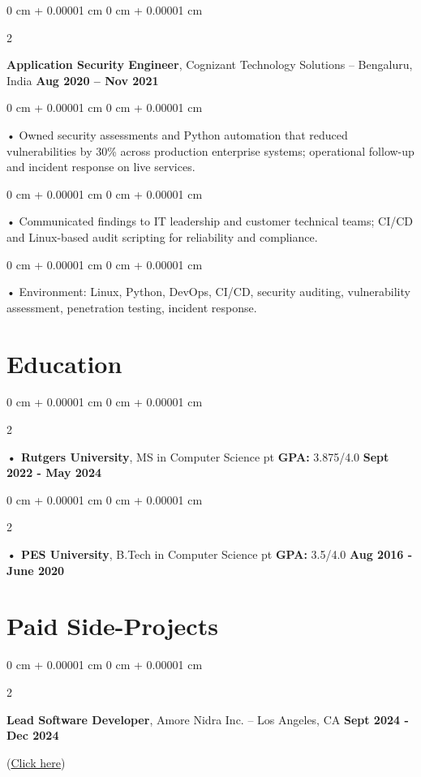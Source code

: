 \documentclass[10pt, letterpaper]{article}
\newenvironment{onecolentry}{
    \begin{adjustwidth}{
        0 cm + 0.00001 cm
    }{
        0 cm + 0.00001 cm
    }
}{
    \end{adjustwidth}
} %
\newenvironment{twocolentry}[2][]{
    \onecolentry
    \def\secondColumn{#2}
    \setcolumnwidth{\fill, 4.5 cm}
    \begin{paracol}{2}
}{
    \switchcolumn \raggedleft \secondColumn
    \end{paracol}
    \endonecolentry
} %
\begin{document}
        \begin{twocolentry}{
            \textbf{Aug 2020 – Nov 2021}
        }
            \vspace{2 pt }
            \textbf{Application Security Engineer}, Cognizant Technology Solutions -- Bengaluru, India\end{twocolentry}
        \begin{onecolentry}
             • Owned security assessments and Python automation that reduced vulnerabilities by 30\% across production enterprise systems; operational follow-up and incident response on live services.
        \end{onecolentry}
        \begin{onecolentry}
             • Communicated findings to IT leadership and customer technical teams; CI/CD and Linux-based audit scripting for reliability and compliance.
        \end{onecolentry}
        \begin{onecolentry}
             • Environment: Linux, Python, DevOps, CI/CD, security auditing, vulnerability assessment, penetration testing, incident response.
        \end{onecolentry}
    \vspace{2 pt }
        \section{Education}
        \vspace{2 pt }
        \begin{twocolentry}{
            \textbf{Sept 2022 - May 2024}
        }
            \textbf{ • Rutgers University}, MS in Computer Science  pt \textbf{GPA:} 3.875/4.0  \end{twocolentry}

        \begin{twocolentry}{
            \textbf{Aug 2016 - June 2020}
        }
            \textbf{ • PES University}, B.Tech in Computer Science  pt \textbf{GPA:} 3.5/4.0  \end{twocolentry}

    \vspace{0.4cm}
    \section{Paid Side-Projects}
            \vspace{2 pt }
        \begin{twocolentry}{
            \textbf{Sept 2024 - Dec 2024}
        }
            \textbf{Lead Software Developer}, Amore Nidra Inc. -- Los Angeles, CA\end{twocolentry}(\href{https://amorenidra.com}{Click here})
\end{document}
